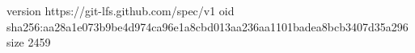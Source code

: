 version https://git-lfs.github.com/spec/v1
oid sha256:aa28a1e073b9be4d974ca96e1a8cbd013aa236aa1101badea8bcb3407d35a296
size 2459
